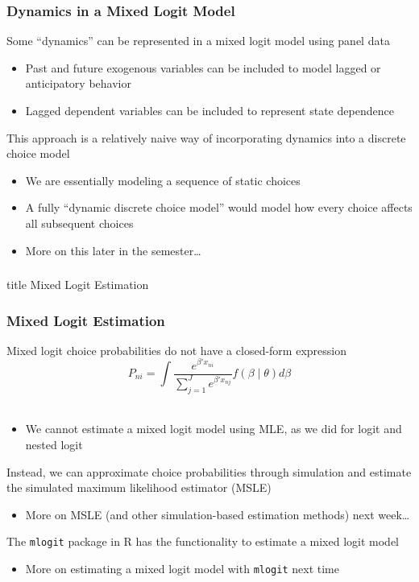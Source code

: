 \documentclass{beamer}
\begin{document}
\begin{frame}\frametitle{Dynamics in a Mixed Logit Model}
    Some ``dynamics'' can be represented in a mixed logit model using panel data
    \begin{itemize}
        \item Past and future exogenous variables can be included to model lagged or anticipatory behavior
        \item Lagged dependent variables can be included to represent state dependence 
    \end{itemize}
    \vspace{3ex}
    This approach is a relatively naive way of incorporating dynamics into a discrete choice model
    \begin{itemize}
        \item We are essentially modeling a sequence of static choices
        \item A fully ``dynamic discrete choice model'' would model how every choice affects all subsequent choices
        \item More on this later in the semester\ldots
    \end{itemize}
\end{frame}

\begin{frame}\frametitle{}
    \vfill
    \centering
    \begin{beamercolorbox}[center]{title}
        \Large Mixed Logit Estimation
    \end{beamercolorbox}
    \vfill
\end{frame}

\begin{frame}\frametitle{Mixed Logit Estimation}
    Mixed logit choice probabilities do not have a closed-form expression
    $$P_{ni} = \int \frac{e^{\beta' x_{ni}}}{\sum_{j = 1}^J e^{\beta' x_{nj}}} f(\beta \mid \theta) d \beta$$ \\
    \begin{itemize}
        \item We cannot estimate a mixed logit model using MLE, as we did for logit and nested logit
    \end{itemize}
    \vspace{2ex}
    Instead, we can approximate choice probabilities through simulation and estimate the simulated maximum likelihood estimator (MSLE)
    \begin{itemize}
        \item More on MSLE (and other simulation-based estimation methods) next week\ldots
    \end{itemize}
    \vspace{2ex}
    The \texttt{mlogit} package in R has the functionality to estimate a mixed logit model
    \begin{itemize}
        \item More on estimating a mixed logit model with \texttt{mlogit} next time
    \end{itemize}
\end{frame}
\end{document}

